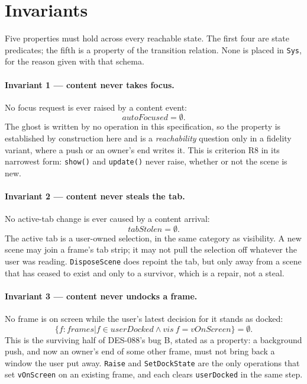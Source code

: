 \documentclass[a4paper,10pt,fleqn]{article}
\begin{document}
\section{Invariants}
\label{sec:inv}

Five properties must hold across every reachable state.  The first four are
state predicates; the fifth is a property of the transition relation.  None
is placed in \texttt{Sys}, for the reason given with that schema.

\paragraph{Invariant 1 --- content never takes focus.}
No focus request is ever raised by a content event:
\[
  autoFocused = \emptyset.
\]
The ghost is written by no operation in this specification, so the property is
established by construction here and is a \emph{reachability} question only in
a fidelity variant, where a push or an owner's end writes it.  This is
criterion R8 in its narrowest form: \texttt{show()} and \texttt{update()}
never raise, whether or not the scene is new.

\paragraph{Invariant 2 --- content never steals the tab.}
No active-tab change is ever caused by a content arrival:
\[
  tabStolen = \emptyset.
\]
The active tab is a user-owned selection, in the same category as visibility.
A new scene may join a frame's tab strip; it may not pull the selection off
whatever the user was reading.  \texttt{DisposeScene} does repoint the tab,
but only away from a scene that has ceased to exist and only to a survivor,
which is a repair, not a steal.

\paragraph{Invariant 3 --- content never undocks a frame.}
No frame is on screen while the user's latest decision for it stands as
docked:
\[
  \{ f : frames | f \in userDocked \land vis~f = vOnScreen \} = \emptyset.
\]
This is the surviving half of DES-088's bug B, stated as a property: a
background push, and now an owner's end of some other frame, must not bring
back a window the user put away.  \texttt{Raise} and \texttt{SetDockState}
are the only operations that set \texttt{vOnScreen} on an existing frame, and
each clears \texttt{userDocked} in the same step.
\end{document}
